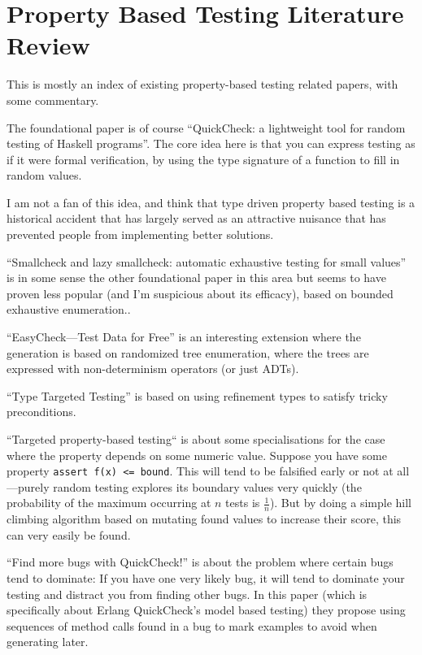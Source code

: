 \chapter{Property Based Testing Literature Review}

This is mostly an index of existing property-based testing related papers,
with some commentary.

The foundational paper is of course ``QuickCheck: a lightweight tool for random testing of Haskell programs''\cite{DBLP:conf/icfp/ClaessenH00}.
The core idea here is that you can express testing as if it were formal verification,
by using the type signature of a function to fill in random values.

I am not a fan of this idea,
and think that type driven property based testing is a historical accident that has largely served as an attractive nuisance that has prevented people from implementing better solutions.

``Smallcheck and lazy smallcheck: automatic exhaustive testing for small values''\cite{DBLP:conf/haskell/RuncimanNL08} is in some sense the other foundational paper in this area
but seems to have proven less popular (and I'm suspicious about its efficacy),
based on bounded exhaustive enumeration..

``EasyCheck---Test Data for Free''\cite{DBLP:conf/flops/ChristiansenF08} is an interesting extension where the generation is based on randomized tree enumeration,
where the trees are expressed with non-determinism operators (or just ADTs).

``Type Targeted Testing''\cite{DBLP:conf/esop/SeidelVJ15} is based on using refinement types to satisfy tricky preconditions.

``Targeted property-based testing``\cite{DBLP:conf/issta/LoscherS17} is about some specialisations for the case where the property depends on some numeric value.
Suppose you have some property \texttt{assert f(x) <= bound}.
This will tend to be falsified early or not at all---purely
random testing explores its boundary values very quickly (the probability of the maximum occurring at \(n\) tests is \(\frac{1}{n}\)).
But by doing a simple hill climbing algorithm based on mutating found values to increase their score,
this can very easily be found.

``Find more bugs with QuickCheck!''\cite{DBLP:conf/icse/HughesNSA16} is about the problem where certain bugs tend to dominate:
If you have one very likely bug,
it will tend to dominate your testing and distract you from finding other bugs.
In this paper (which is specifically about Erlang QuickCheck's model based testing) they propose using sequences of method calls found in a bug to mark examples to avoid when generating later.

